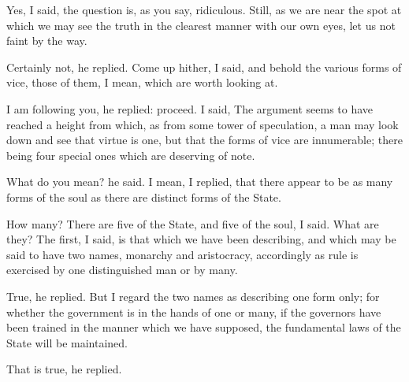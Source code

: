 Yes, I said, the question is, as you say, ridiculous. Still, as we are near the spot at which we may see the truth in the clearest manner with our own eyes, let us not faint by the way.

Certainly not, he replied.
Come up hither, I said, and behold the various forms of vice, those of them, I mean, which are worth looking at.

I am following you, he replied: proceed.
I said, The argument seems to have reached a height from which, as from some tower of speculation, a man may look down and see that virtue is one, but that the forms of vice are innumerable; there being four special ones which are deserving of note.

What do you mean? he said.
I mean, I replied, that there appear to be as many forms of the soul as there are distinct forms of the State.

How many?
There are five of the State, and five of the soul, I said.
What are they?
The first, I said, is that which we have been describing, and which may be said to have two names, monarchy and aristocracy, accordingly as rule is exercised by one distinguished man or by many.

True, he replied.
But I regard the two names as describing one form only; for whether the government is in the hands of one or many, if the governors have been trained in the manner which we have supposed, the fundamental laws of the State will be maintained.

That is true, he replied.